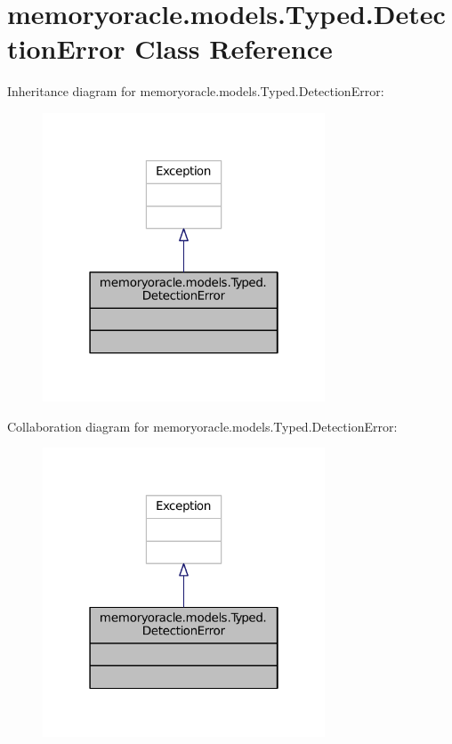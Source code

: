 \hypertarget{classmemoryoracle_1_1models_1_1Typed_1_1DetectionError}{}\section{memoryoracle.\+models.\+Typed.\+Detection\+Error Class Reference}
\label{classmemoryoracle_1_1models_1_1Typed_1_1DetectionError}


Inheritance diagram for memoryoracle.\+models.\+Typed.\+Detection\+Error\+:\nopagebreak
\begin{figure}[H]
\begin{center}
\leavevmode
\includegraphics[width=238pt]{classmemoryoracle_1_1models_1_1Typed_1_1DetectionError__inherit__graph}
\end{center}
\end{figure}


Collaboration diagram for memoryoracle.\+models.\+Typed.\+Detection\+Error\+:\nopagebreak
\begin{figure}[H]
\begin{center}
\leavevmode
\includegraphics[width=238pt]{classmemoryoracle_1_1models_1_1Typed_1_1DetectionError__coll__graph}
\end{center}
\end{figure}


